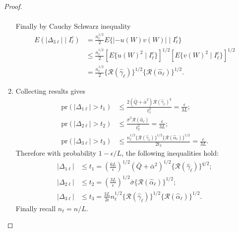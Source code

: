 \begin{proof}
\begin{enumerate}
\begin{align*}
    \end{align*}
    Finally by Cauchy Schwarz inequality
    \begin{align*}
        E(|\Delta_{3\ell}|\mid I^c_{\ell})
        &=\frac{n_{\ell}^{1/2}}{2}  E\{|-u(W)v(W)|\mid I^c_{\ell}\} \\
        &\leq \frac{n_{\ell}^{1/2}}{2} [E\{u(W)^2\mid I^c_{\ell}\}]^{1/2} [E\{v(W)^2\mid I^c_{\ell}\}]^{1/2} \\
        &=\frac{n_{\ell}^{1/2}}{2}  \{\mathcal{R}(\hat{\gamma}_{\ell})\}^{1/2}\{\mathcal{R}(\hat{\alpha}_{\ell})\}^{1/2}.
    \end{align*}
    \item Collecting results gives
     \begin{align*}
        \text{pr}(|\Delta_{1\ell}|>t_1)&\leq \frac{2 (\bar{Q}+\bar{\alpha}^2) \mathcal{R}(\hat{\gamma}_{\ell})^q}{t_1^2}=\frac{\epsilon}{3L};\\
        \text{pr}(|\Delta_{2\ell}|>t_2)&\leq \frac{\bar{\sigma}^2 \mathcal{R}(\hat{\alpha}_{\ell})}{t_2^2}=\frac{\epsilon}{3L}; \\
        \text{pr}(|\Delta_{3\ell}|>t_3)&\leq \frac{n_{\ell}^{1/2} \{\mathcal{R}(\hat{\gamma}_{\ell})\}^{1/2}\{\mathcal{R}(\hat{\alpha}_{\ell})\}^{1/2}}{2t_3}=\frac{\epsilon}{3L}.
    \end{align*}
    Therefore with probability $1-\epsilon/L$, the following inequalities hold:
\begin{align*}
    |\Delta_{1\ell}|&\leq t_1=\left(\frac{6L}{\epsilon}\right)^{1/2}(\bar{Q}+\bar{\alpha}^2)^{1/2}\{\mathcal{R}(\hat{\gamma}_{\ell})\}^{q/2};\\
    |\Delta_{2\ell}|&\leq t_2=\left(\frac{3L}{\epsilon}\right)^{1/2}\bar{\sigma}\{\mathcal{R}(\hat{\alpha}_{\ell})\}^{1/2} ;\\
    |\Delta_{3\ell}|&\leq t_3=\frac{3L}{2\epsilon}n_{\ell}^{1/2}\{\mathcal{R}(\hat{\gamma}_{\ell})\}^{1/2}\{\mathcal{R}(\hat{\alpha}_{\ell})\}^{1/2}.
\end{align*}
Finally recall $n_{\ell}=n/L$.
\end{enumerate}
\end{proof}


